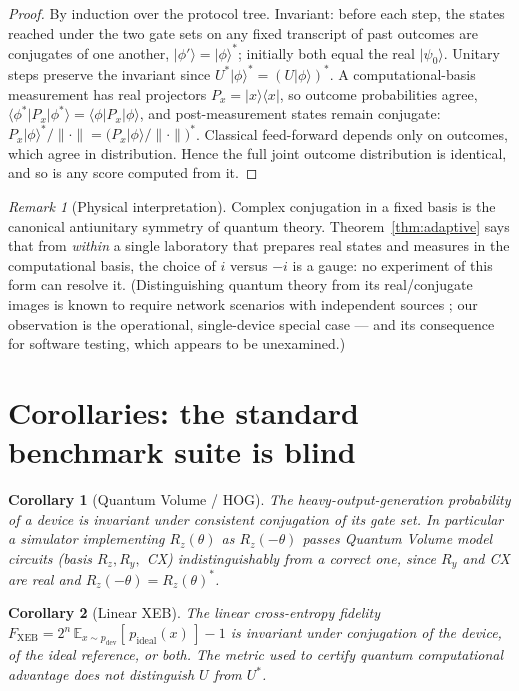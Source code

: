 \documentclass[11pt]{article}
\newtheorem{corollary}{Corollary}
\theoremstyle{definition}
\theoremstyle{remark}
\newtheorem{remark}{Remark}
\newcommand{\ket}[1]{\lvert #1 \rangle}
\newcommand{\bra}[1]{\langle #1 \rvert}
\begin{document}
\begin{proof}
By induction over the protocol tree. Invariant: before each step, the
states reached under the two gate sets on any fixed transcript of past
outcomes are conjugates of one another, $\ket{\phi'} = \ket{\phi}^{*}$;
initially both equal the real $\ket{\psi_{0}}$. Unitary steps preserve
the invariant since $U^{*}\ket{\phi}^{*} = (U\ket{\phi})^{*}$.
A computational-basis measurement has real projectors
$P_{x} = \ket{x}\bra{x}$, so outcome probabilities agree,
$\bra{\phi^{*}}P_{x}\ket{\phi^{*}} = \bra{\phi}P_{x}\ket{\phi}$,
and post-measurement states remain conjugate:
$P_{x}\ket{\phi}^{*}/\|\cdot\| = \bigl(P_{x}\ket{\phi}/\|\cdot\|\bigr)^{*}$.
Classical feed-forward depends only on outcomes, which agree in
distribution. Hence the full joint outcome distribution is identical,
and so is any score computed from it.
\end{proof}

\begin{remark}[Physical interpretation]
Complex conjugation in a fixed basis is the canonical antiunitary
symmetry of quantum theory. Theorem~\ref{thm:adaptive} says that from
\emph{within} a single laboratory that prepares real states and measures
in the computational basis, the choice of $i$ versus $-i$ is a gauge:
no experiment of this form can resolve it. (Distinguishing quantum
theory from its real/conjugate images is known to require network
scenarios with independent sources \cite{renou2021}; our observation is
the operational, single-device special case --- and its consequence for
software testing, which appears to be unexamined.)
\end{remark}

\section{Corollaries: the standard benchmark suite is blind}

\begin{corollary}[Quantum Volume / HOG]\label{cor:qv}
The heavy-output-generation probability of a device is invariant under
consistent conjugation of its gate set. In particular a simulator
implementing $R_z(\theta)$ as $R_z(-\theta)$ passes Quantum Volume model
circuits (basis $R_z, R_y,$ CX) indistinguishably from a correct one,
since $R_y$ and CX are real and $R_z(-\theta) = R_z(\theta)^{*}$.
\end{corollary}

\begin{corollary}[Linear XEB]\label{cor:xeb}
The linear cross-entropy fidelity
$F_{\mathrm{XEB}} = 2^{n}\,\mathbb{E}_{x \sim p_{\mathrm{dev}}}
[\,p_{\mathrm{ideal}}(x)\,] - 1$
is invariant under conjugation of the device, of the ideal reference, or
both. \emph{The metric used to certify quantum computational advantage
does not distinguish $U$ from $U^{*}$.}
\end{corollary}
\end{document}
